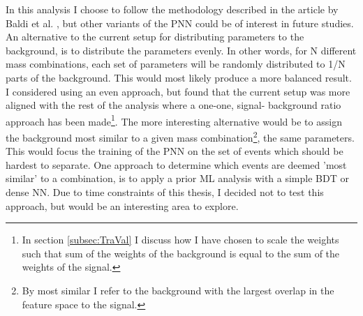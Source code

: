 In this analysis I choose to follow the methodology described in the article by Baldi et al. \cite{PNN}, but other variants of the \ac{PNN} could 
be of interest in future studies. An alternative to the current setup for distributing parameters to the background, is to distribute the parameters evenly. 
In other words, for N different mass combinations, each set of parameters will be randomly distributed to 1/N parts of the background. This would most likely produce a
more balanced result. I considered using an even approach, but found that the current setup was more aligned with the rest of the analysis where a one-one, signal-
background ratio approach has been made\footnote{In section \ref{subsec:TraVal} I discuss how I have chosen to scale the weights such that sum of the weights of 
the background is equal to the sum of the weights of the signal.}. The more interesting alternative would be to assign the background most similar to a given mass 
combination\footnote{By most similar I refer to the background with the largest overlap in the feature space to the signal.}, the same parameters. This would 
focus the training of the \ac{PNN} on the set of events which should be hardest to separate. One approach to determine which events are deemed 'most similar' to a 
combination, is to apply a prior \ac{ML} analysis with a simple \ac{BDT} or dense \ac{NN}. Due to time constraints of this thesis, I decided not to test this 
approach, but would be an interesting area to explore.